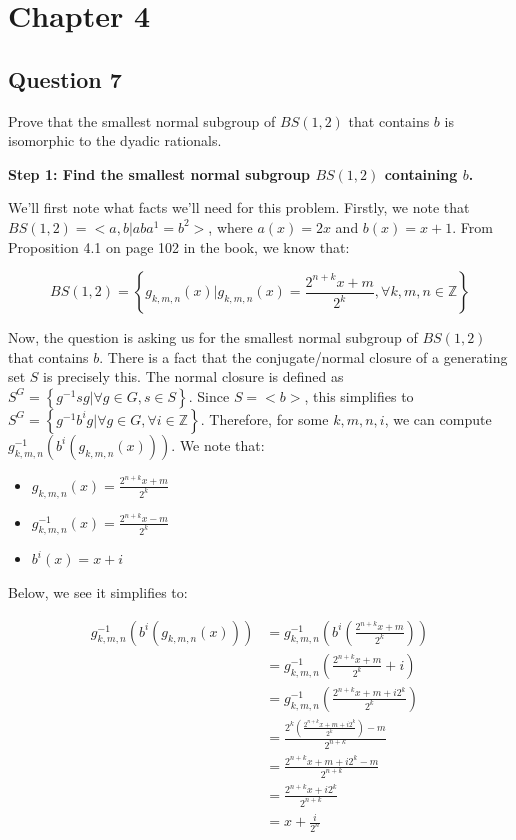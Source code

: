 \documentclass[12pt]{article}%
\newcommand{\Z}{\mathbb{Z}}
\begin{document}
\section*{Chapter 4}

\subsection*{Question 7}

Prove that the smallest normal subgroup of $BS(1, 2)$ that contains $b$ is isomorphic to the dyadic
rationals.

\textbf{Step 1: Find the smallest normal subgroup $BS(1,2)$ containing $b$.}

We'll first note what facts we'll need for this problem. Firstly, we note that $BS(1,2)=<a,b|aba^1=b^2>$,
where $a(x)=2x$ and $b(x)=x+1$.  From Proposition 4.1 on page 102 in the book, we know that:

\begin{equation}
BS(1,2)=\left\{g_{k,m,n}(x) | g_{k,m,n}(x)=\frac{2^{n+k}x+m}{2^k}, \forall k, m, n \in \Z \right\}
\end{equation}

Now, the question is asking us for the smallest normal subgroup of $BS(1,2)$ that contains $b$. There is a
fact that the conjugate/normal closure of a generating set $S$ is precisely this. The normal closure is
defined as $S^G=\left\{g^{-1}sg|\forall g\in G, s\in S\right\}$. Since $S=<b>$, this simplifies to
$S^G=\left\{g^{-1}b^{i}g|\forall g\in G, \forall i \in \Z \right\}$. Therefore, for some $k, m, n, i$, we
can compute $g_{k,m,n}^{-1}(b^{i}(g_{k,m,n}(x)))$. We note that:

\begin{itemize}
\item $g_{k,m,n}(x)=\frac{2^{n+k}x+m}{2^k}$
\item $g_{k,m,n}^{-1}(x)=\frac{2^{n+k}x-m}{2^k}$
\item $b^{i}(x)=x+i$ %
\end{itemize}
Below, we see it simplifies to:

\begin{align*}
g_{k,m,n}^{-1}(b^{i}(g_{k,m,n}(x)))
&= g_{k,m,n}^{-1}\left(b^{i}\left(\frac{2^{n+k}x+m}{2^k}\right)\right) \\
&= g_{k,m,n}^{-1}\left(\frac{2^{n+k}x+m}{2^k}+i\right) \\
&= g_{k,m,n}^{-1}\left(\frac{2^{n+k}x+m+i2^k}{2^k}\right) \\
&= \frac{2^k\left(\frac{2^{n+k}x+m+i2^k}{2^k}\right)-m}{2^{n+k}} \\
&= \frac{2^{n+k}x+m+i2^k-m}{2^{n+k}} \\
&= \frac{2^{n+k}x+i2^k}{2^{n+k}} \\
&= x+\frac{i}{2^{n}}
\end{align*}
\end{document}
